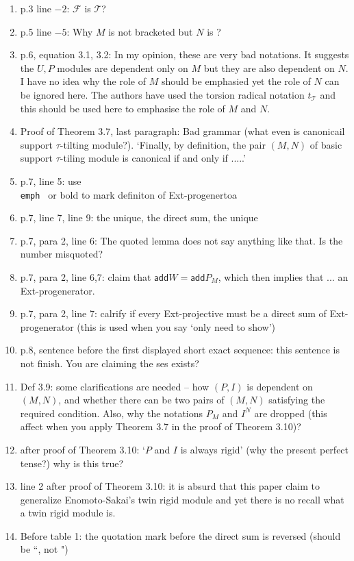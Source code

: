 \documentclass[a4,11pt]{article}
\begin{document}
\begin{enumerate}[(1)] 

\item p.3 line $-2$: $\mathcal{F}$ is $\mathcal{T}$?

\item p.5 line $-5$:  Why $M$ is not bracketed but $N$ is ?

\item p.6, equation 3.1, 3.2:  In my opinion, these are very bad notations.  It suggests the $U,P$ modules are dependent only on $M$ but they are also dependent on $N$.  I have no idea why the role of $M$ should be emphasied yet the role of $N$ can be ignored here.  The authors have used the torsion radical notation $t_{\mathcal{T}}$ and this should be used here to emphasise the role of $M$ and $N$.

\item Proof of Theorem 3.7, last paragraph:  Bad grammar (what even is canonicail support $\tau$-tilting module?).  `Finally, by definition, the   
pair $(M,N)$ of basic support $\tau$-tiling module is canonical if and only if .....'

\item p.7, line 5: use \texttt{\\emph } or bold to mark definiton of Ext-progenertoa

\item p.7, line 7, line 9: the unique, the direct sum, the unique

\item p.7, para 2, line 6: The quoted lemma does not say anything like that.  Is the number misquoted?

\item p.7, para 2, line 6,7:  claim that $\mathsf{add} W= \mathsf{add} P_M$, which then implies that ... an Ext-progenerator.

\item p.7, para 2, line 7:  calrify if every Ext-projective must be a direct sum of Ext-progenerator  (this is used when you say `only need to show')

\item p.8, sentence before the first displayed short exact sequence:  this sentence is not finish.  You are claiming the ses exists?

\item Def 3.9: some clarifications are needed -- how $(P,I)$ is dependent on $(M,N)$, and whether there can be two pairs of $(M,N)$ satisfying the required condition.  Also, why the notations $P_M$ and $I^N$ are dropped (this affect when you apply Theorem 3.7 in the proof of Theorem 3.10)?

\item after proof of Theorem 3.10:  `$P$ and $I$ is always rigid' (why the present perfect tense?)  why is this true?

\item line 2 after proof of Theorem 3.10:  it is absurd that this paper claim to generalize Enomoto-Sakai's twin rigid module and yet there is no recall what a twin rigid module is.

\item Before table 1:  the quotation mark before the direct sum is reversed (should be ``, not ")
\end{enumerate}
\end{document}
